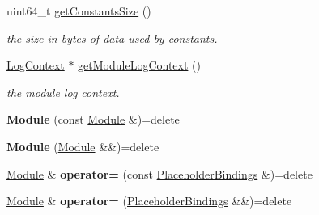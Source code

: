 \begin{DoxyCompactItemize}
\mbox{\label{classglow_1_1_module_afb5b04bb6e293e248144830ca704a2eb}} 
uint64\+\_\+t \hyperlink{classglow_1_1_module_afb5b04bb6e293e248144830ca704a2eb}{get\+Constants\+Size} ()
\begin{DoxyCompactList}\small\item\em the size in bytes of data used by constants. \end{DoxyCompactList}\item 
\mbox{\label{classglow_1_1_module_abfe5c5b0291110dd5b9d98c6ab3c3902}} 
\hyperlink{classglow_1_1_log_context}{Log\+Context} $\ast$ \hyperlink{classglow_1_1_module_abfe5c5b0291110dd5b9d98c6ab3c3902}{get\+Module\+Log\+Context} ()
\begin{DoxyCompactList}\small\item\em the module log context. \end{DoxyCompactList}\item 
\mbox{\label{classglow_1_1_module_a62d24a297e54e2f6e47f3ae54b573fa4}} 
{\bfseries Module} (const \hyperlink{classglow_1_1_module}{Module} \&)=delete
\item 
\mbox{\label{classglow_1_1_module_a16db90d7baa3a0b74328ac4437216f56}} 
{\bfseries Module} (\hyperlink{classglow_1_1_module}{Module} \&\&)=delete
\item 
\mbox{\label{classglow_1_1_module_ac1fde9a6b9f333c76eff036c30df44bc}} 
\hyperlink{classglow_1_1_module}{Module} \& {\bfseries operator=} (const \hyperlink{classglow_1_1_placeholder_bindings}{Placeholder\+Bindings} \&)=delete
\item 
\mbox{\label{classglow_1_1_module_a1000231cfbba3b6340545b6aa49dd006}} 
\hyperlink{classglow_1_1_module}{Module} \& {\bfseries operator=} (\hyperlink{classglow_1_1_placeholder_bindings}{Placeholder\+Bindings} \&\&)=delete
\end{DoxyCompactItemize}
